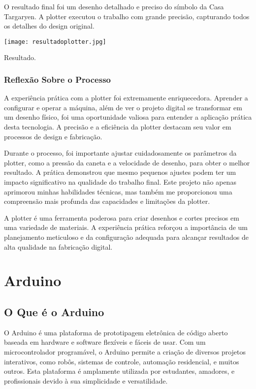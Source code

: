\documentclass[
]{book}
\begin{document}
O resultado final foi um desenho detalhado e preciso do símbolo da Casa Targaryen. A plotter executou o trabalho com grande precisão, capturando todos os detalhes do design original.

\texttt{[image: resultadoplotter.jpg]}

Resultado.

\subsection{Reflexão Sobre o Processo}\label{reflexuxe3o-sobre-o-processo-2}

A experiência prática com a plotter foi extremamente enriquecedora. Aprender a configurar e operar a máquina, além de ver o projeto digital se transformar em um desenho físico, foi uma oportunidade valiosa para entender a aplicação prática desta tecnologia. A precisão e a eficiência da plotter destacam seu valor em processos de design e fabricação.

Durante o processo, foi importante ajustar cuidadosamente os parâmetros da plotter, como a pressão da caneta e a velocidade de desenho, para obter o melhor resultado. A prática demonstrou que mesmo pequenos ajustes podem ter um impacto significativo na qualidade do trabalho final. Este projeto não apenas aprimorou minhas habilidades técnicas, mas também me proporcionou uma compreensão mais profunda das capacidades e limitações da plotter.

A plotter é uma ferramenta poderosa para criar desenhos e cortes precisos em uma variedade de materiais. A experiência prática reforçou a importância de um planejamento meticuloso e da configuração adequada para alcançar resultados de alta qualidade na fabricação digital.

\chapter{Arduino}\label{arduino}

\section{O Que é o Arduino}\label{o-que-uxe9-o-arduino}

O Arduino é uma plataforma de prototipagem eletrônica de código aberto baseada em hardware e software flexíveis e fáceis de usar. Com um microcontrolador programável, o Arduino permite a criação de diversos projetos interativos, como robôs, sistemas de controle, automação residencial, e muitos outros. Esta plataforma é amplamente utilizada por estudantes, amadores, e profissionais devido à sua simplicidade e versatilidade.
\end{document}
